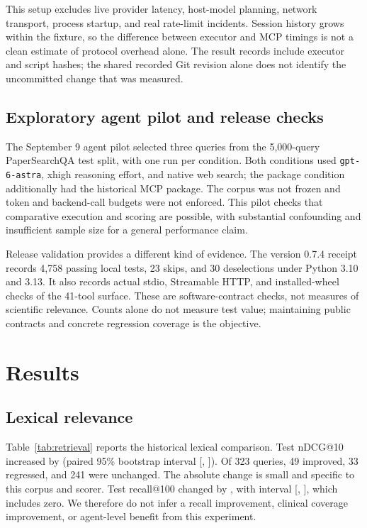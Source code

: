 \documentclass[11pt]{article}
\begin{document}
This setup excludes live provider latency, host-model planning, network transport,
process startup, and real rate-limit incidents. Session history grows within the
fixture, so the difference between executor and MCP timings is not a clean estimate
of protocol overhead alone. The result records include executor and script hashes;
the shared recorded Git revision alone does not identify the uncommitted change
that was measured.

\subsection{Exploratory agent pilot and release checks}
The September 9 agent pilot selected three queries from the 5,000-query
PaperSearchQA test split, with one run per condition. Both conditions used
\texttt{gpt-6-astra}, xhigh reasoning effort, and native web search; the package
condition additionally had the historical MCP package. The corpus was not frozen
and token and backend-call budgets were not enforced. This pilot checks that
comparative execution and scoring are possible, with substantial confounding and
insufficient sample size for a general performance claim.

Release validation provides a different kind of evidence. The version 0.7.4
receipt records 4,758 passing local tests, 23 skips, and 30 deselections under
Python 3.10 and 3.13. It also records actual stdio, Streamable HTTP, and installed-wheel
checks of the 41-tool surface. These are software-contract checks, not measures
of scientific relevance. Counts alone do not measure test value; maintaining
public contracts and concrete regression coverage is the objective.

\section{Results}
\subsection{Lexical relevance}
Table~\ref{tab:retrieval} reports the historical lexical comparison. Test nDCG@10
increased by \NdcgDelta{} (paired 95\% bootstrap interval
[\NdcgLow{}, \NdcgHigh{}]). Of 323 queries, 49 improved, 33 regressed, and 241 were
unchanged. The absolute change is small and specific to this corpus and scorer.
Test recall@100 changed by \RecallDelta{}, with interval
[\RecallLow{}, \RecallHigh{}], which includes zero. We therefore do not infer a
recall improvement, clinical coverage improvement, or agent-level benefit from
this experiment.

\end{document}
